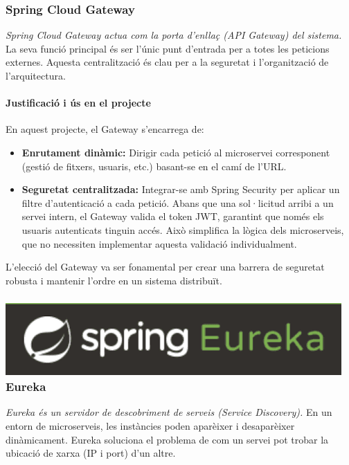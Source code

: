 \subsubsection{\gatewaylogo\hspace{0.5em}Spring Cloud Gateway}
\textit{Spring Cloud Gateway actua com la porta d'enllaç (API Gateway) del sistema.} La seva funció principal és ser l'únic punt d'entrada per a totes les peticions externes. Aquesta centralització és clau per a la seguretat i l'organització de l'arquitectura.

\paragraph{Justificació i ús en el projecte}
En aquest projecte, el Gateway s'encarrega de:
\begin{itemize}
    \item \textbf{Enrutament dinàmic:} Dirigir cada petició al microservei corresponent (gestió de fitxers, usuaris, etc.) basant-se en el camí de l'URL.
    \item \textbf{Seguretat centralitzada:} Integrar-se amb Spring Security per aplicar un filtre d'autenticació a cada petició. Abans que una sol·licitud arribi a un servei intern, el Gateway valida el token JWT, garantint que només els usuaris autenticats tinguin accés. Això simplifica la lògica dels microserveis, que no necessiten implementar aquesta validació individualment.
\end{itemize}
L'elecció del Gateway va ser fonamental per crear una barrera de seguretat robusta i mantenir l'ordre en un sistema distribuït.

\newcommand{\eureka}{\includegraphics[height=4ex]{Figures/logos/eureka.png}}

\subsubsection{\eureka\hspace{0.5em}Eureka}
\textit{Eureka és un servidor de descobriment de serveis (Service Discovery).} En un entorn de microserveis, les instàncies poden aparèixer i desaparèixer dinàmicament. Eureka soluciona el problema de com un servei pot trobar la ubicació de xarxa (IP i port) d'un altre.

